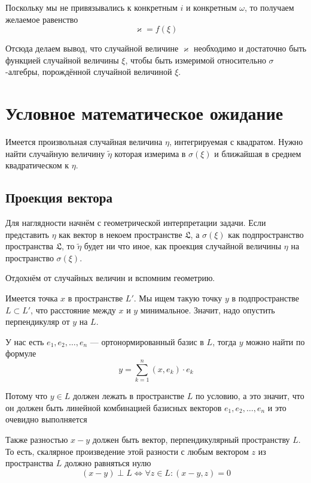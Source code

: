Поскольку мы не привязывались к конкретным $i$ и конкретным $\omega$,
то получаем желаемое равенство
$$\varkappa = f\left( \xi \right)$$

Отсюда делаем вывод, что случайной величине $\varkappa$
необходимо и достаточно быть функцией случайной величины $\xi$,
чтобы быть измеримой относительно $\sigma$-алгебры,
порождённой случайной величиной $\xi$.

\section{Условное математическое ожидание}
Имеется произвольная случайная величина $\eta$, интегрируемая с квадратом.
Нужно найти случайную величину $\tilde{\eta}$ которая
измерима в $\sigma\left( \xi \right)$
и ближайшая в среднем квадратическом к $\eta$.

\subsection{Проекция вектора}
Для наглядности начнём с геометрической интерпретации задачи.
Если представить $\eta$ как вектор в некоем пространстве $\mathfrak{L}$,
а $\sigma\left( \xi \right)$ как подпространство пространства $\mathfrak{L}$,
то $\tilde{\eta}$ будет ни что иное, как проекция случайной величины $\eta$
на пространство $\sigma\left( \xi \right)$.

Отдохнём от случайных величин и вспомним геометрию.

Имеется точка $x$ в пространстве $L'$.
Мы ищем такую точку $y$ в подпространстве $L\subset L'$,
что расстояние между $x$ и $y$ минимальное.
Значит, надо опустить перпендикуляр от $y$ на $L$.

У нас есть $e_1, e_2, \dots, e_n$ --- ортонормированный базис в $L$,
тогда $y$ можно найти по формуле
\begin{equation}\label{vectorProjection}
    y = \sum_{k=1}^n \left( x, e_k \right) \cdot e_k
\end{equation}

Потому что $y \in L$ должен лежать в пространстве $L$ по условию,
а это значит, что он должен быть линейной комбинацией базисных векторов
$e_1, e_2, \dots, e_n$ и это очевидно выполняется

Также разностью $x-y$ должен быть вектор, перпендикулярный пространству $L$.
То есть, скалярное произведение этой разности с любым вектором $z$
из пространства $L$ должно равняться нулю
$$\left( x-y \right) \perp L
    \Leftrightarrow \forall z \in L:
    \left( x-y,z \right)=0$$

